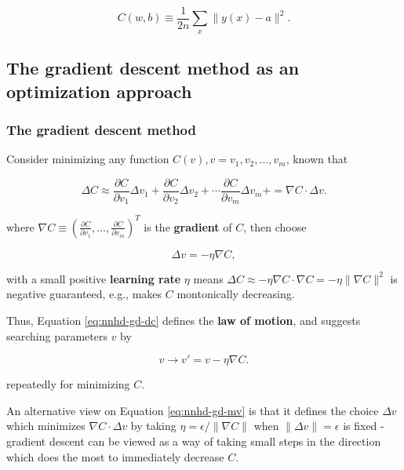\documentclass[]{book}
\begin{document}
\begin{equation}  
C(w,b) \equiv \frac{1}{2n} \sum_x \| y(x) - a\|^2.
\label{eq:nnhd-gd-cf}
\end{equation}

\subsection{The gradient descent method as an optimization
approach}\label{the-gradient-descent-method-as-an-optimization-approach}

\subsubsection{The gradient descent
method}\label{the-gradient-descent-method}

Consider minimizing any function \(C(v), v = v_1, v_2, \ldots, v_m\),
known that

\begin{equation} 
\Delta C \approx \frac{\partial C}{\partial v_1} \Delta v_1 + 
                 \frac{\partial C}{\partial v_2} \Delta v_2 +
                 \cdots
                 \frac{\partial C}{\partial v_m} \Delta v_m +
         = \nabla C \cdot \Delta v.
\label{eq:nnhd-gd-1d}
\end{equation}

where
\(\displaystyle \nabla C \equiv \left(\frac{\partial C}{\partial v_1}, \ldots, \frac{\partial C}{\partial v_m}\right)^T\)
is the \textbf{gradient} of \(C\), then choose

\begin{equation} 
\Delta v = -\eta \nabla C,
\label{eq:nnhd-gd-dc}
\end{equation}

with a small positive \textbf{learning rate} \(\eta\) means
\(\displaystyle \Delta C \approx -\eta \nabla C \cdot \nabla C = -\eta \|\nabla C\|^2\)
is negative guaranteed, e.g., makes \(C\) montonically decreasing.

Thus, Equation \eqref{eq:nnhd-gd-dc} defines the \textbf{law of motion},
and suggests searching parameters \(v\) by

\begin{equation}
v \rightarrow v' = v -\eta \nabla C.
\label{eq:nnhd-gd-mv}
\end{equation}

repeatedly for minimizing \(C\).

An alternative view on Equation \eqref{eq:nnhd-gd-mv} is that it defines
the choice \(\Delta v\) which minimizes \(\nabla C \cdot \Delta v\) by
taking \(\eta = \epsilon / \|\nabla C\|\) when
\(\|\Delta v\| = \epsilon\) is fixed - gradient descent can be viewed as
a way of taking small steps in the direction which does the most to
immediately decrease \(C\).
\end{document}
